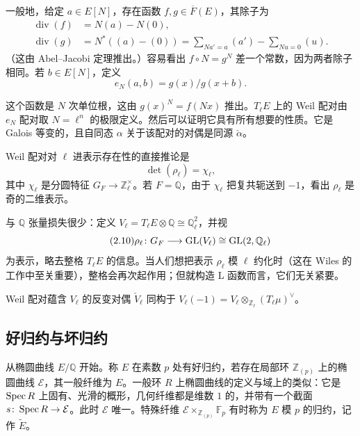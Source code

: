 一般地，给定 $a\in E[N]$，存在函数 $f,g\in\overline{F}(E)$，其除子为
\begin{equation}\tag{2.7}\label{c5:eq:2.7}
\begin{aligned}
\operatorname{div}(f)&=N(a)-N(0),\\
\operatorname{div}(g)&=N^*((a)-(0))=\sum_{Na'=a}(a')-\sum_{Nu=0}(u).
\end{aligned}
\end{equation}
（这由 Abel--Jacobi 定理推出。）容易看出 $f\circ N=g^N$ 差一个常数，因为两者除子相同。若 $b\in E[N]$，定义
\begin{equation}\tag{2.8}\label{c5:eq:2.8}
e_N(a,b)=g(x)/g(x+b).
\end{equation}

这个函数是 $N$ 次单位根，这由 $g(x)^N=f(Nx)$ 推出。$T_\ell E$ 上的 Weil 配对由 $e_N$ 配对取 $N=\ell^n$ 的极限定义。然后可以证明它具有所有想要的性质。它是 Galois 等变的，且自同态 $\alpha$ 关于该配对的对偶是同源 $\check{\alpha}$。

Weil 配对对 $\ell$ 进表示存在性的直接推论是
\begin{equation}\tag{2.9}\label{c5:eq:2.9}
\det(\rho_\ell)=\chi_\ell,
\end{equation}
其中 $\chi_\ell$ 是分圆特征 $G_F\to\mathbb{Z}_\ell^\times$。若 $F=\mathbb{Q}$，由于 $\chi_\ell$ 把复共轭送到 $-1$，看出 $\rho_\ell$ 是奇的二维表示。

与 $\mathbb{Q}$ 张量损失很少：定义 $V_\ell=T_\ell E\otimes\mathbb{Q}\cong\mathbb{Q}_\ell^2$，并视
\begin{equation}\tag{2.10}\label{c5:eq:2.10}
\rho_\ell\colon G_F\longrightarrow\mathrm{GL}(V_\ell)\cong\mathrm{GL}(2,\mathbb{Q}_\ell)
\end{equation}
为表示，略去整格 $T_\ell E$ 的信息。当人们想把表示 $\rho_\ell$ 模 $\ell$ 约化时（这在 Wiles 的工作中至关重要），整格会再次起作用；但就构造 L 函数而言，它们无关紧要。

Weil 配对蕴含 $V_\ell$ 的反变对偶 $\check{V}_\ell$ 同构于 $V_\ell(-1)=V_\ell\otimes_{\mathbb{Z}_\ell}(T_\ell\mu)^\vee$。
\subsection{好归约与坏归约}\label{c5:sec:2.3}

从椭圆曲线 $E/\mathbb{Q}$ 开始。称 $E$ 在素数 $p$ 处有好归约，若存在局部环 $\mathbb{Z}_{(p)}$ 上的椭圆曲线 $\mathcal{E}$，其一般纤维为 $E$。一般环 $R$ 上椭圆曲线的定义与域上的类似：它是 $\operatorname{Spec} R$ 上固有、光滑的概形，几何纤维都是维数 $1$ 的，并带有一个截面 $s\colon\operatorname{Spec} R\to\mathcal{E}$。此时 $\mathcal{E}$ 唯一。特殊纤维 $\mathcal{E}\times_{\mathbb{Z}_{(p)}}\mathbb{F}_p$ 有时称为 $E$ 模 $p$ 的归约，记作 $\tilde{E}$。

